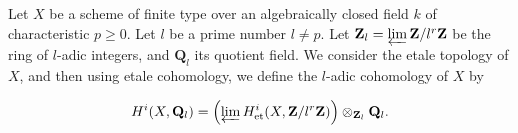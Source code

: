 Let $X$ be a scheme of finite type over an algebraically closed field $k$ of characteristic $p \geqslant 0$. Let $l$ be a prime number $l \neq p$. Let $\mathbf{Z}_l = \varprojlim \mathbf{Z}/l^r\mathbf{Z}$ be the ring of $l$-adic integers, and $\mathbf{Q}_l$ its quotient field. We consider the etale topology of $X$, and then using etale cohomology, we define the $l$-adic cohomology of $X$ by

$$H^i(X, \mathbf{Q}_l) = \left( \varprojlim H^i_{\text{et}}(X, \mathbf{Z}/l^r\mathbf{Z}) \right) \otimes_{\mathbf{Z}_l} \mathbf{Q}_l.$$